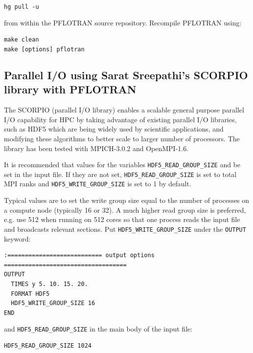 {\texttt{hg pull -u} 

\noindent
from within the PFLOTRAN source repository.
Recompile PFLOTRAN using:

\texttt{make clean}\\
\indent
\texttt{make [options] pflotran}

\subsection{Parallel I/O using Sarat Sreepathi's SCORPIO library with PFLOTRAN}
\label{parallelio}

The SCORPIO (parallel I/O library) enables a scalable general purpose parallel I/O capability for HPC by taking advantage of existing parallel I/O libraries, such as HDF5 which are being widely used by scientific applications, and modifying these algorithms to better scale to larger number of processors. The library has been tested with MPICH-3.0.2 and OpenMPI-1.6.

\normalsize
It is recommended that values for the variables {\footnotesize\tt HDF5\_READ\_GROUP\_SIZE} and  be set in the input file. 
If they are not set, {\footnotesize\texttt{HDF5\_READ\_GROUP\_SIZE}} is set to total MPI ranks and {\footnotesize\texttt{HDF5\_WRITE\_GROUP\_SIZE}} is set to 1 by default.

Typical values are to set the write group size equal to the number of processes on a compute node (typically 16 or 32). 
A much higher read group size is preferred, e.g. use 512 when running on 512 cores so that one process reads the input file and broadcasts relevant sections.
Put {\footnotesize\texttt{HDF5\_WRITE\_GROUP\_SIZE}} under the {\footnotesize\texttt{OUTPUT}} keyword:
\footnotesize
\begin{Verbatim}
:=========================== output options ===================================
OUTPUT
  TIMES y 5. 10. 15. 20.
  FORMAT HDF5
  HDF5_WRITE_GROUP_SIZE 16
END
\end{Verbatim}
\normalsize
and {\footnotesize\tt HDF5\_READ\_GROUP\_SIZE} in the main body of the input file:
\footnotesize
\begin{Verbatim}
HDF5_READ_GROUP_SIZE 1024
\end{Verbatim}
\normalsize

}
